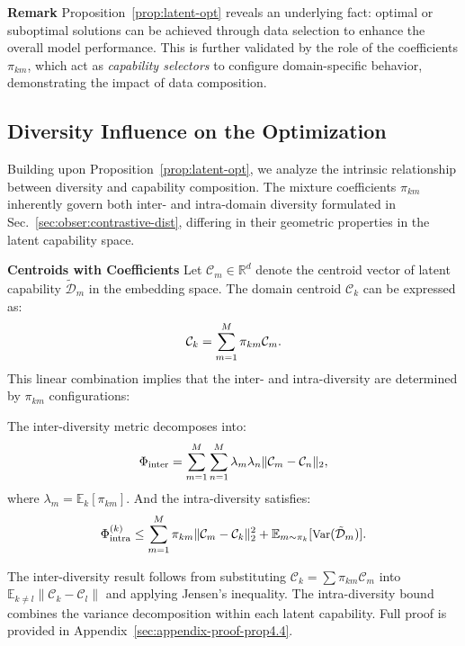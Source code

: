 \textbf{Remark} Proposition~\ref{prop:latent-opt} reveals an underlying fact: optimal or suboptimal solutions can be achieved through data selection to enhance the overall model performance. This is further validated by the role of the coefficients \(\pi_{km}\), which act as \textit{capability selectors} to configure domain-specific behavior, demonstrating the impact of data composition.



\subsection{Diversity Influence on the Optimization}
Building upon Proposition~\ref{prop:latent-opt}, we analyze the intrinsic relationship between diversity and capability composition. The mixture coefficients \(\pi_{km}\) inherently govern both inter- and intra-domain diversity formulated in Sec.~\ref{sec:obser:contrastive-dist}, differing in their geometric properties in the latent capability space.

\textbf{Centroids with Coefficients} Let \(\mathcal{C}_m \in \mathbb{R}^d\) denote the centroid vector of latent capability \(\tilde{\mathcal{D}}_m\) in the embedding space. The domain centroid \(\mathcal{C}_k\) can be expressed as:
\begin{equation}
\small
\label{eq:centroid-coe}
    \mathcal{C}_k = \sum_{m=1}^M \pi_{km} \mathcal{C}_m.
\end{equation}
This linear combination implies that the inter- and intra-diversity are determined by \(\pi_{km}\) configurations:
\begin{proposition}
\label{prop:diversity-decomp}
The inter-diversity metric decomposes into:
\begin{equation}
\small
    \Phi_{\text{inter}} = \sum_{m=1}^M \sum_{n=1}^M \lambda_m \lambda_n \|\mathcal{C}_m - \mathcal{C}_n\|_2,
\end{equation}
where \(\lambda_m = \mathbb{E}_k[\pi_{km}]\). And the intra-diversity satisfies:
\begin{equation}
\small
    \Phi_{\text{intra}}^{(k)} \leq \sum_{m=1}^M \pi_{km} \|\mathcal{C}_m - \mathcal{C}_k\|_2^2 + \mathbb{E}_{m\sim\pi_k}[\text{Var}(\tilde{\mathcal{D}}_m)].
\end{equation}
\end{proposition}
The inter-diversity result follows from substituting \(\mathcal{C}_k = \sum \pi_{km}\mathcal{C}_m\) into \(\mathbb{E}_{k\neq l}\|\mathcal{C}_k - \mathcal{C}_l\|\) and applying Jensen's inequality. The intra-diversity bound combines the variance decomposition within each latent capability. Full proof is provided in Appendix~\ref{sec:appendix-proof-prop4.4}.

